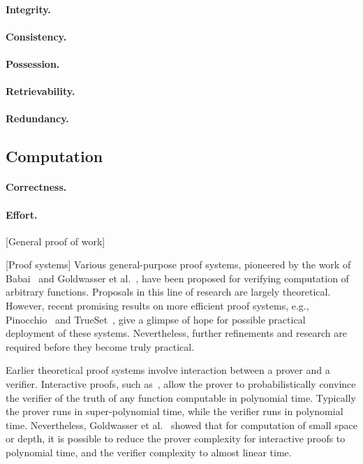 \paragraph{Integrity.}

\paragraph{Consistency.}

\paragraph{Possession.}

\paragraph{Retrievability.}

\paragraph{Redundancy.}




\subsection{Computation}

\paragraph{Correctness.}

\paragraph{Effort.}

[General proof of work]

[Proof systems]
Various general-purpose proof systems, pioneered by the work of Babai~\cite{Bab85} and Goldwasser et al.~\cite{GMR89}, have been proposed for verifying computation of arbitrary functions.
Proposals in this line of research are largely theoretical.
However, recent promising results on more efficient proof systems, e.g., Pinocchio~\cite{PHG+13} and TrueSet~\cite{KPP+14}, give a glimpse of hope for possible practical deployment of these systems.
Nevertheless, further refinements and research are required before they become truly practical.

Earlier theoretical proof systems involve interaction between a prover and a verifier.
Interactive proofs, such as~\cite{LFK+92,Sha92}, allow the prover to probabilistically convince the verifier of the truth of any function computable in polynomial time.
Typically the prover runs in super-polynomial time, while the verifier runs in polynomial time.
Nevertheless, Goldwasser et al.~\cite{GKR08} showed that for computation of small space or depth, it is possible to reduce the prover complexity for interactive proofs to polynomial time, and the verifier complexity to almost linear time.  

